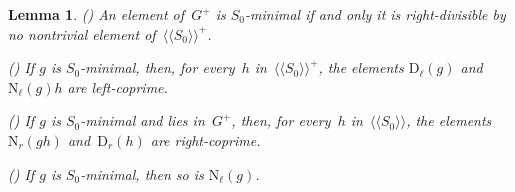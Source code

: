 \documentclass{amsart}
\numberwithin{equation}{section}
\theoremstyle{plain}
\newtheorem{lemm}[prop]{Lemma}
\theoremstyle{definition}
\newcounter{ITEM}
\begin{document}
\begin{lemm}
\label{L:Minimal}
{\setcounter{ITEM}{1}\leavevmode\hbox{\rm()}} An element of~${G^{\scriptscriptstyle+}}$ is ${S}_0$-minimal if and only it is right-divisible by no nontrivial element of~${\langle\!\langle{{{S}_0}}\rangle\!\rangle^{\!\scriptscriptstyle+}}$.

{\setcounter{ITEM}{2}\leavevmode\hbox{\rm()}} If ${g}$ is ${S}_0$-minimal, then, for every~${h}$ in~${\langle\!\langle{{{S}_0}}\rangle\!\rangle^{\!\scriptscriptstyle+}}$, the elements ${{\scriptstyle\mathrm{D}}{_{\ell}}({g})}$ and~${{\scriptstyle\mathrm{N}}{_{\ell}}({g})} {h}$ are left-coprime.

{\setcounter{ITEM}{3}\leavevmode\hbox{\rm()}} If ${g}$ is ${S}_0$-minimal and lies in~${G^{\scriptscriptstyle+}}$, then, for every~${h}$ in~${\langle\!\langle{{{S}_0}}\rangle\!\rangle}$, the elements ${{\scriptstyle\mathrm{N}}{_{r}}({{g} {h}})}$ and~${{\scriptstyle\mathrm{D}}{_{r}}({h})}$ are right-coprime.
 
{\setcounter{ITEM}{4}\leavevmode\hbox{\rm()}} If ${g}$ is ${S}_0$-minimal, then so is ${{\scriptstyle\mathrm{N}}{_{\ell}}({g})}$.
\end{lemm} 
\end{document}
